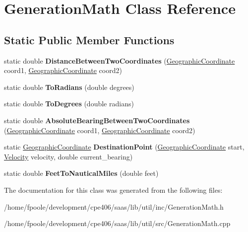 \hypertarget{class_generation_math}{}\section{Generation\+Math Class Reference}
\label{class_generation_math}
\subsection*{Static Public Member Functions}
\begin{DoxyCompactItemize}
\item 
\hypertarget{class_generation_math_a8f4229f305cb61561b4f1c64ad829600}{}static double {\bfseries Distance\+Between\+Two\+Coordinates} (\hyperlink{class_geographic_coordinate}{Geographic\+Coordinate} coord1, \hyperlink{class_geographic_coordinate}{Geographic\+Coordinate} coord2)\label{class_generation_math_a8f4229f305cb61561b4f1c64ad829600}

\item 
\hypertarget{class_generation_math_a9772f5cb452f3b8c734e2cfcb4db425f}{}static double {\bfseries To\+Radians} (double degrees)\label{class_generation_math_a9772f5cb452f3b8c734e2cfcb4db425f}

\item 
\hypertarget{class_generation_math_a66b84a2e4343391feee0803bb07a6ad1}{}static double {\bfseries To\+Degrees} (double radians)\label{class_generation_math_a66b84a2e4343391feee0803bb07a6ad1}

\item 
\hypertarget{class_generation_math_a173f0e9759687dbf576c98bbe94e1bca}{}static double {\bfseries Absolute\+Bearing\+Between\+Two\+Coordinates} (\hyperlink{class_geographic_coordinate}{Geographic\+Coordinate} coord1, \hyperlink{class_geographic_coordinate}{Geographic\+Coordinate} coord2)\label{class_generation_math_a173f0e9759687dbf576c98bbe94e1bca}

\item 
\hypertarget{class_generation_math_a80b7f2898ff6bfb3fa5259570fda6e0f}{}static \hyperlink{class_geographic_coordinate}{Geographic\+Coordinate} {\bfseries Destination\+Point} (\hyperlink{class_geographic_coordinate}{Geographic\+Coordinate} start, \hyperlink{class_velocity}{Velocity} velocity, double current\+\_\+bearing)\label{class_generation_math_a80b7f2898ff6bfb3fa5259570fda6e0f}

\item 
\hypertarget{class_generation_math_ab647331f2410fde65b1e949c5d877391}{}static double {\bfseries Feet\+To\+Nautical\+Miles} (double feet)\label{class_generation_math_ab647331f2410fde65b1e949c5d877391}

\end{DoxyCompactItemize}


The documentation for this class was generated from the following files\+:\begin{DoxyCompactItemize}
\item 
/home/fpoole/development/cpe406/saas/lib/util/inc/Generation\+Math.\+h\item 
/home/fpoole/development/cpe406/saas/lib/util/src/Generation\+Math.\+cpp\end{DoxyCompactItemize}
